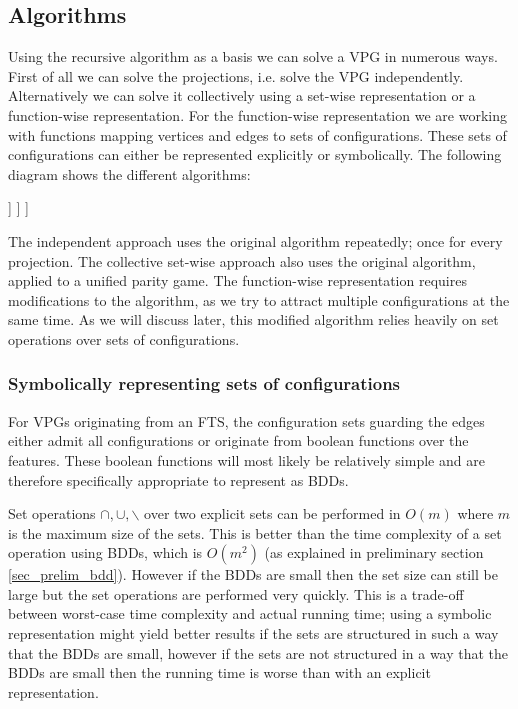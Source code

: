 \subsection{Algorithms}
Using the recursive algorithm as a basis we can solve a VPG in numerous ways. First of all we can solve the projections, i.e. solve the VPG independently. Alternatively we can solve it collectively using a set-wise representation or a function-wise representation. For the function-wise representation we are working with functions mapping vertices and edges to sets of configurations. These sets of configurations can either be represented explicitly or symbolically. The following diagram shows the different algorithms:
\begin{center}
	\begin{forest}
		[Recursive algorithm, for tree={parent anchor=south, child anchor=north, align=center, s sep=5mm}
		[Independent]
		[Collective
		[Set-wise]
		[Function-wise
		[Explicit]
		[Symbolic]
		]
		]
		]
	\end{forest}
\end{center}
The independent approach uses the original algorithm repeatedly; once for every projection. The collective set-wise approach also uses the original algorithm, applied to a unified parity game. The function-wise representation requires modifications to the algorithm, as we try to attract multiple configurations at the same time. As we will discuss later, this modified algorithm relies heavily on set operations over sets of configurations. 

\subsubsection{Symbolically representing sets of configurations}
\label{sec:symrepconfs}
For VPGs originating from an FTS, the configuration sets guarding the edges either admit all configurations or originate from boolean functions over the features. These boolean functions will most likely be relatively simple and are therefore specifically appropriate to represent as BDDs.

Set operations $\cap,\cup,\backslash$ over two explicit sets can be performed in $O(m)$ where $m$ is the maximum size of the sets. This is better than the time complexity of a set operation using BDDs, which is $O(m^2)$ (as explained in preliminary section \ref{sec_prelim_bdd}). However if the BDDs are small then the set size can still be large but the set operations are performed very quickly. This is a trade-off between worst-case time complexity and actual running time; using a symbolic representation might yield better results if the sets are structured in such a way that the BDDs are small, however if the sets are not structured in a way that the BDDs are small then the running time is worse than with an explicit representation.


